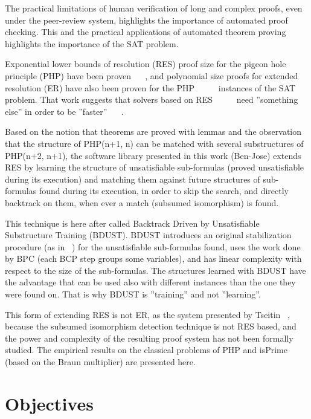 \documentclass{easychair}
\begin{document}
The practical limitations of human verification of long and complex proofs, even under the peer-review system, highlights the importance of automated proof checking. This and the practical applications of automated theorem proving highlights the importance of the SAT problem.

Exponential lower bounds of resolution (RES) proof size for the pigeon hole principle (PHP) have been proven ~\cite{haken-85} ~\cite{buss-88}, and polynomial size proofs for extended resolution (ER) have also been proven for the PHP  ~\cite{cook-76} ~\cite{cook-79} ~\cite{jarvisalo-07} instances of the SAT problem. That work suggests that solvers based on RES ~\cite{silva-95} ~\cite{moskewicz-01} ~\cite{een-04} need ''something else'' in order to be ''faster'' ~\cite{dixon-04} ~\cite{audemard-10}. 

Based on the notion that theorems are proved with lemmas and the observation that the structure of PHP(n+1, n) can be matched with several substructures of PHP(n+2, n+1), the software library presented in this work (Ben-Jose) extends RES by learning the structure of unsatisfiable sub-formulas (proved unsatisfiable during its execution) and matching them against future structures of sub-formulas found during its execution, in order to skip the search, and directly backtrack on them, when ever a match (subsumed isomorphism) is found. 

This technique is here after called Backtrack Driven by Unsatisfiable Substructure Training (BDUST). BDUST introduces an original stabilization procedure (as in ~\cite{bastert-02}) for the unsatisfiable sub-formulas found, uses the work done by BPC (each BCP step groups some variables), and has linear complexity with respect to the size of the sub-formulas. The structures learned with BDUST have the advantage that can be used also with different instances than the one they were found on. That is why BDUST is ''training'' and not ''learning''.

This form of extending RES is not ER, as the system presented by Tseitin ~\cite{tseitin-83}, because the subsumed isomorphism detection technique is not RES based, and the power and complexity of the resulting proof system has not been formally studied. The empirical results on the classical problems of PHP and isPrime (based on the Braun multiplier) are presented here. 

\section{Objectives}
\label{sect:objectives}
\end{document}
